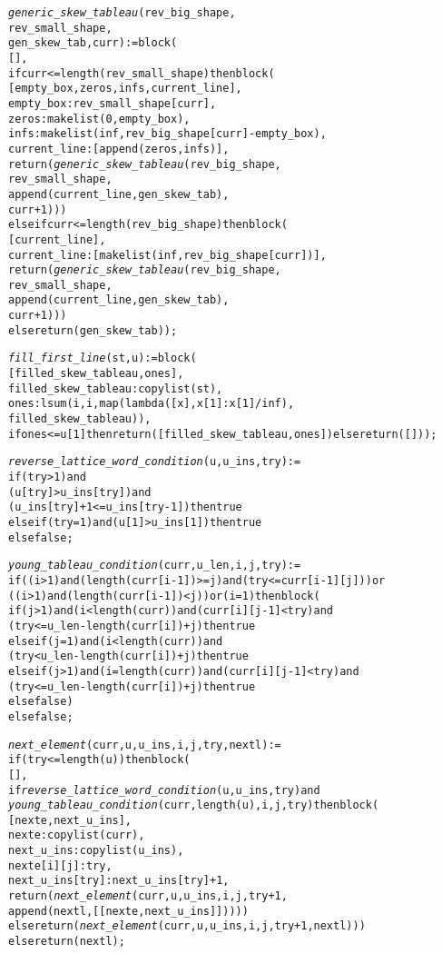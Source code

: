 \begin{alltt}
\emph{generic\_skew\_tableau} (rev\_big\_shape,
                      rev\_small\_shape,
                      gen\_skew\_tab, curr) := block (
  [],
  if curr <= length (rev\_small\_shape) then block (
    [empty\_box,zeros,infs,current\_line],
    empty\_box : rev\_small\_shape[curr],
    zeros : makelist (0, empty\_box),
    infs : makelist (inf, rev\_big\_shape[curr] - empty\_box),
    current\_line : [append (zeros, infs)],
    return (\emph{generic\_skew\_tableau} (rev\_big\_shape,
                                  rev\_small\_shape,
                                  append (current\_line, gen\_skew\_tab),
                                  curr + 1)))
  else if curr <= length (rev\_big\_shape) then block (
    [current\_line],
    current\_line : [makelist (inf, rev\_big\_shape[curr])],
    return (\emph{generic\_skew\_tableau} (rev\_big\_shape,
                                  rev\_small\_shape,
                                  append (current\_line, gen\_skew\_tab),
                                  curr + 1)))
  else return (gen\_skew\_tab));

\emph{fill\_first\_line} (st, u) := block (
  [filled\_skew\_tableau, ones],
  filled\_skew\_tableau : copylist (st),
  ones : lsum (i, i, map (lambda ([x], x[1] : x[1]/inf),
               filled\_skew\_tableau)),
  if ones <= u[1] then return ([filled\_skew\_tableau, ones]) else return ([]));

\emph{reverse\_lattice\_word\_condition} (u, u\_ins, try) :=
if (try > 1) and
   (u[try] > u\_ins[try]) and
   (u\_ins[try] + 1 <= u\_ins [try-1]) then true
else if (try = 1) and (u[1] > u\_ins[1]) then true
else false;

\emph{young\_tableau\_condition} (curr, u\_len, i, j, try) :=
if ((i>1) and (length(curr[i-1])>=j) and (try<=curr[i-1][j])) or
   ((i>1) and (length(curr[i-1])<j)) or (i=1) then block (
  if (j>1) and (i<length(curr)) and (curr[i][j-1]<try) and
     (try<=u\_len-length(curr[i])+j) then true
  else if (j=1) and (i<length(curr)) and
          (try<u\_len-length(curr[i])+j) then true
  else if (j>1) and (i=length(curr)) and (curr[i][j-1]<try) and
          (try<=u\_len-length(curr[i])+j) then true
  else false)
else false;

\emph{next\_element} (curr, u, u\_ins, i, j, try, nextl) :=
if (try <= length (u)) then block (
  [],
  if \emph{reverse\_lattice\_word\_condition} (u, u\_ins, try) and
     \emph{young\_tableau\_condition} (curr, length (u), i, j, try) then block (
    [nexte, next\_u\_ins],
    nexte : copylist (curr),
    next\_u\_ins : copylist (u\_ins),
    nexte[i][j] : try,
    next\_u\_ins[try] : next\_u\_ins[try] + 1,
    return (\emph{next\_element} (curr, u, u\_ins, i, j, try + 1,
                          append (nextl, [[nexte, next\_u\_ins]]))))
  else return (\emph{next\_element} (curr, u, u\_ins, i, j, try + 1, nextl)))
else return (nextl); 


\end{alltt}
